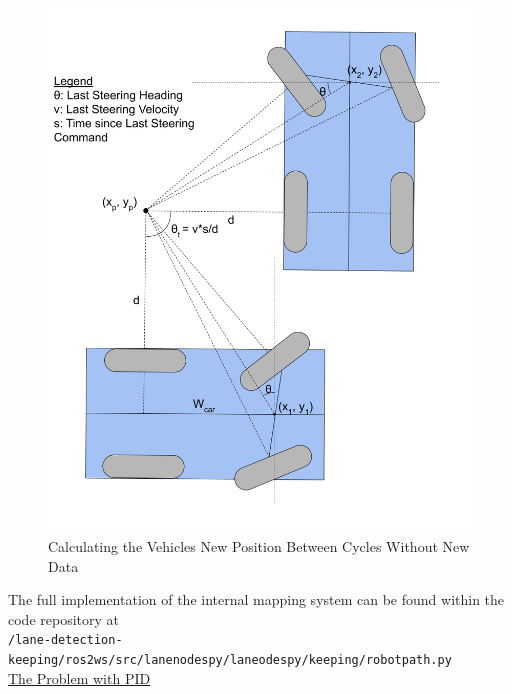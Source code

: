 \documentclass[titlepage,draft]{article}
\begin{document}
{\begin{figure}
	\centering
	\includegraphics[width=5in]{update_description}
	\caption{Calculating the Vehicles New Position Between Cycles Without New Data}
	\label{fig:internal_update_determination}
\end{figure}

The full implementation of the internal mapping system can be found within the code repository at \\
\texttt{/lane-detection-keeping/ros2\textunderscore ws/src/lane\textunderscore nodes\textunderscore py/lane\textunderscore odes\textunderscore py/keeping/robot\textunderscore path.py}
\\

\underline{The Problem with PID}

}
\end{document}
